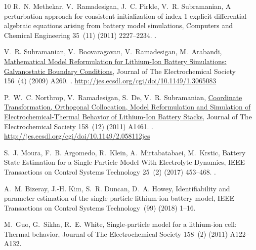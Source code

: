 \documentclass[a4paper]{article}
\begin{document}
\begin{thebibliography}{10}
    R.~N. Methekar, V.~Ramadesigan, J.~C. Pirkle, V.~R. Subramanian, {A
      perturbation approach for consistent initialization of index-1 explicit
      differential-algebraic equations arising from battery model simulations},
      Computers and Chemical Engineering 35~(11) (2011) 2227--2234.
    \newblock \href {https://doi.org/10.1016/j.compchemeng.2011.01.003}
      {}.
    
    V.~R. Subramanian, V.~Boovaragavan, V.~Ramadesigan, M.~Arabandi,
      \href{http://jes.ecsdl.org/cgi/doi/10.1149/1.3065083}{{Mathematical Model
      Reformulation for Lithium-Ion Battery Simulations: Galvanostatic Boundary
      Conditions}}, Journal of The Electrochemical Society 156~(4) (2009) A260.
    \newblock \href {https://doi.org/10.1149/1.3065083}
      {}.
    \newline\urlprefix\url{http://jes.ecsdl.org/cgi/doi/10.1149/1.3065083}
    
    P.~W.~C. Northrop, V.~Ramadesigan, S.~De, V.~R. Subramanian,
      \href{http://jes.ecsdl.org/cgi/doi/10.1149/2.058112jes}{{Coordinate
      Transformation, Orthogonal Collocation, Model Reformulation and Simulation of
      Electrochemical-Thermal Behavior of Lithium-Ion Battery Stacks}}, Journal of
      The Electrochemical Society 158~(12) (2011) A1461.
    \newblock \href {https://doi.org/10.1149/2.058112jes}
      {}.
    \newline\urlprefix\url{http://jes.ecsdl.org/cgi/doi/10.1149/2.058112jes}
    
    S.~J. Moura, F.~B. Argomedo, R.~Klein, A.~Mirtabatabaei, M.~Krstic, {Battery
      State Estimation for a Single Particle Model With Electrolyte Dynamics}, IEEE
      Transactions on Control Systems Technology 25~(2) (2017) 453--468.
    \newblock \href {https://doi.org/10.1109/tcst.2016.2571663}
      {}.
    
    A.~M. Bizeray, J.-H. Kim, S.~R. Duncan, D.~A. Howey, Identifiability and
      parameter estimation of the single particle lithium-ion battery model, IEEE
      Transactions on Control Systems Technology~(99) (2018) 1--16.
    
    M.~Guo, G.~Sikha, R.~E. White, Single-particle model for a lithium-ion cell:
      Thermal behavior, Journal of The Electrochemical Society 158~(2) (2011)
      A122--A132.
    

\end{thebibliography}
\end{document}
